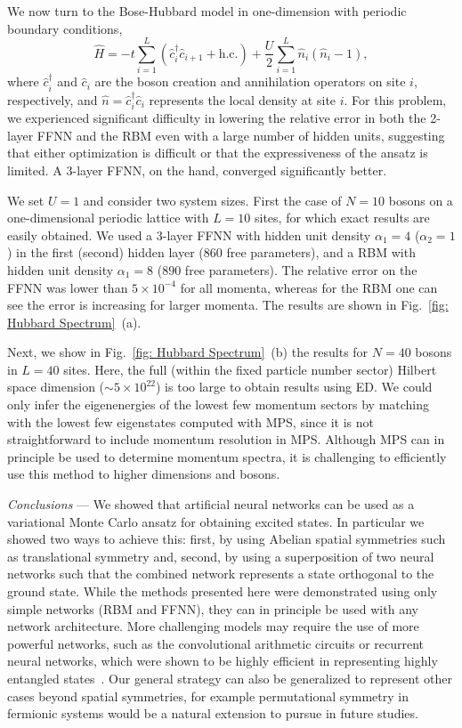 \documentclass[aps,prl,twocolumn,amsmath,amssymb,superscriptaddress,floatfix]{revtex4-1}
\begin{document}
We now turn to the Bose-Hubbard model in one-dimension with periodic boundary conditions, 
\begin{equation}
\hat{H} = -t \sum^{L}_{i=1} (\hat{c}^{\dagger}_{i}\hat{c}_{i+1} + \textrm{h.c.}) + \frac{U}{2} \sum^{L}_{i=1} \hat{n}_{i} (\hat{n}_{i} - 1),
\end{equation}
where $\hat{c}^{\dagger}_i$ and $\hat{c}_i$ are the boson creation and annihilation operators on site $i$, respectively, and $\hat{n} = \hat{c}_i^{\dagger}\hat{c}_i$ represents the local density at site $i$. For this problem, we experienced significant difficulty in lowering the relative error in both the 2-layer FFNN and the RBM even with a large number of hidden units, suggesting that either optimization is difficult or that the expressiveness of the ansatz is limited. A 3-layer FFNN, on the hand, converged significantly better.

We set $U=1$ and consider two system sizes. First the case of $N=10$  bosons on a one-dimensional periodic lattice with $L=10$ sites, for which exact results are easily obtained.  We used a 3-layer FFNN with hidden unit density $\alpha_1 = 4$ ($\alpha_2 = 1$) in the first (second) hidden layer ($860$ free parameters), and a RBM with hidden unit density $\alpha_1 = 8$ ($890$ free parameters). The relative error on the FFNN was lower than $5\times 10^{-4}$ for all momenta, whereas for the RBM one can see the error is increasing for larger momenta. The results are shown in Fig.~\ref{fig: Hubbard Spectrum}~(a).

Next, we show in Fig.~\ref{fig: Hubbard Spectrum}~(b) the results for $N=40$ bosons in $L=40$ sites. Here, the full (within the fixed particle number sector) Hilbert space dimension ($\sim 5 \times 10^{22}$) is too large to obtain results using ED. We could only infer the eigenenergies of the lowest few momentum sectors by matching with the lowest few eigenstates computed with MPS, since it is not straightforward to include momentum resolution in MPS.  Although MPS \cite{VerstraeteMPSsymmetry2013,VertraeteMPSSpin2018} can in principle be used to determine momentum spectra, it is challenging to efficiently use this method to higher dimensions and bosons.

\textit{Conclusions} --- We showed that artificial neural networks can be used as a variational Monte Carlo ansatz for obtaining excited states. In particular we showed two ways to achieve this: first, by using Abelian spatial symmetries such as translational symmetry and, second, by using a superposition of two neural networks such that the combined network represents a state orthogonal to the ground state. While the methods presented here were demonstrated using only simple networks (RBM and FFNN), they can in principle be used with any network architecture. More challenging models may require the use of more powerful networks, such as the convolutional arithmetic circuits or recurrent neural networks, which were shown to be highly efficient in representing highly entangled states~\cite{LevineShashua2018}. Our general strategy can also be generalized to represent other cases beyond spatial symmetries, for example permutational symmetry in fermionic systems would be a natural extension to pursue in future studies.  
\end{document}
